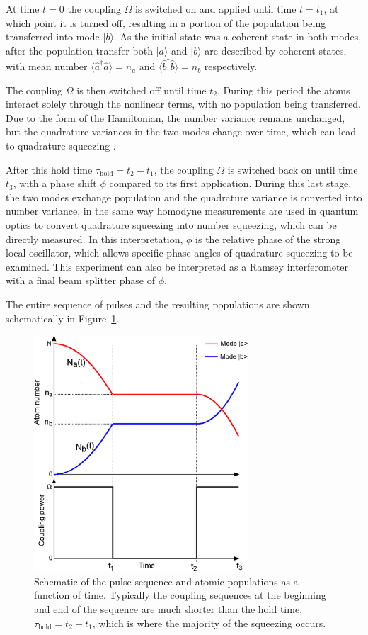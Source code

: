 \documentclass{iopart}
\begin{document}
At time $t=0$ the coupling $\Omega$ is switched on and applied until time $t=t_1$, at which point it is turned off, resulting in a portion of the population being transferred into mode $|b\rangle$. As the initial state was a coherent state in both modes, after the population transfer both $|a\rangle$ and $|b\rangle$ are described by coherent states, with mean number $\langle \hat{a}^{\dagger} \hat{a} \rangle = n_a$ and $\langle \hat{b}^{\dagger} \hat{b} \rangle = n_b$ respectively.

The coupling $\Omega$ is then switched off until time $t_2$. During this period the atoms interact solely through the nonlinear terms, with no population being transferred. Due to the form of the Hamiltonian, the number variance remains unchanged, but the quadrature variances in the two modes change over time, which can lead to quadrature squeezing \cite{johnssonET2007}.

After this hold time $\tau_{\mathrm{hold}} = t_2 - t_1 $, the coupling $\Omega$ is switched back on until time $t_3$, with a phase shift $\phi$ compared to its first application. During this last stage, the two modes exchange population and the quadrature variance is converted into number variance, in the same way homodyne measurements are used in quantum optics to convert quadrature squeezing into number squeezing, which can be directly measured. In this interpretation, $\phi$ is the relative phase of the strong local oscillator, which allows specific phase angles of quadrature squeezing to be examined.  This experiment can also be interpreted as a Ramsey interferometer with a final beam splitter phase of $\phi$.

The entire sequence of pulses and the resulting populations are shown schematically in Figure~\ref{figPulseScheme}.

\begin{figure}
    \centering
    \includegraphics[width=8cm]{figures/pulse_scheme.eps}
    \caption{Schematic of the pulse sequence and atomic populations as a function of time.  Typically the coupling sequences at the beginning and end of the sequence are much shorter than the hold time, $\tau_{\mathrm{hold}} = t_2 - t_1 $, which is where the majority of the squeezing occurs.}
    \label{figPulseScheme}
\end{figure}
\end{document}

